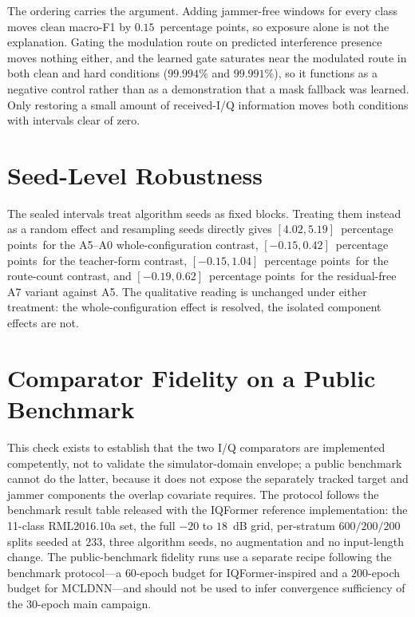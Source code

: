 \documentclass[letterpaper,onecolumn,11pt,journal]{IEEEtran}
\newcommand{\pp}{percentage points}
\begin{document}
The ordering carries the argument. Adding jammer-free windows for every class
moves clean macro-F1 by $0.15$~\pp, so exposure alone is not the explanation.
Gating the modulation route on predicted interference presence moves nothing
either, and the learned gate saturates near the modulated route in both clean
and hard conditions ($99.994\%$ and $99.991\%$), so it functions as a negative
control rather than as a demonstration that a mask fallback was learned. Only
restoring a small amount of received-I/Q information moves both conditions with
intervals clear of zero.

\section{Seed-Level Robustness}
The sealed intervals treat algorithm seeds as fixed blocks. Treating them
instead as a random effect and resampling seeds directly gives
$[4.02,5.19]$~\pp\ for the A5--A0 whole-configuration contrast,
$[-0.15,0.42]$~\pp\ for the teacher-form contrast, $[-0.15,1.04]$~\pp\ for the
route-count contrast, and $[-0.19,0.62]$~\pp\ for the residual-free A7 variant
against A5. The qualitative reading is unchanged under either treatment: the
whole-configuration effect is resolved, the isolated component effects are not.

\section{Comparator Fidelity on a Public Benchmark}
This check exists to establish that the two I/Q comparators are implemented
competently, not to validate the simulator-domain envelope; a public benchmark
cannot do the latter, because it does not expose the separately tracked target
and jammer components the overlap covariate requires. The protocol follows the
benchmark result table released with the IQFormer reference implementation:
the 11-class RML2016.10a set, the full $-20$ to $18$~dB grid, per-stratum
$600/200/200$ splits seeded at $233$, three algorithm seeds, no augmentation
and no input-length change. The public-benchmark fidelity runs use a separate
recipe following the benchmark protocol---a $60$-epoch budget for
IQFormer-inspired and a $200$-epoch budget for MCLDNN---and should not be used
to infer convergence sufficiency of the $30$-epoch main campaign.
\end{document}
